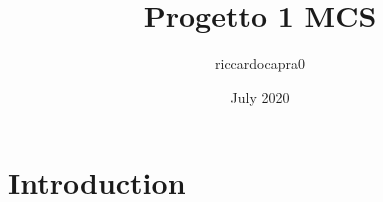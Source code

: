 \documentclass{article}
\title{Progetto 1 MCS}
\author{riccardocapra0 }
\date{July 2020}
\begin{document}
\maketitle

\section{Introduction}
\end{document}

